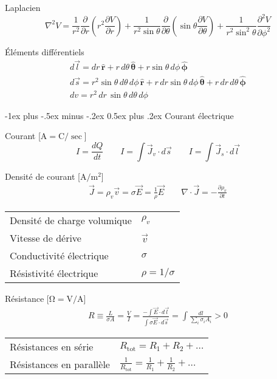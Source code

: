 \documentclass[10pt,landscape]{article}
\makeatletter
\renewcommand{\section}{\@startsection{section}{1}{0mm}%
                                {-1ex plus -.5ex minus -.2ex}%
                                {0.5ex plus .2ex}%
                                {\normalfont\large\bfseries}}
\newcommand{\extraline}{\vspace{1em}}
\newcommand{\tableindent}{\hspace{1.5em}}
\newcommand{\uvec}[1]{\ensuremath{\boldsymbol{\hat{#1}}}}
\makeatother
\begin{document}
\begin{multicols}{3}
Laplacien
\[ \nabla^2 V = \frac{1}{r^2} \frac{\partial}{\partial r}\left( r^2 \frac{\partial V}{\partial r} \right)
+ \frac{1}{r^2\sin\theta}\frac{\partial}{\partial \theta} \left( \sin\theta \frac{\partial V}{\partial\theta} \right)
+ \frac{1}{r^2\sin^2\theta}\frac{\partial^2 V}{\partial \phi^2} \]

Éléments différentiels
\begin{gather*}
d\vec{l} = dr\,\uvec{r} + r\,d\theta\,\uvec{\theta} + r\sin\theta\,d\phi\,\uvec{\phi} \\
d\vec{s} = r^2\sin\theta\,d\theta\,d\phi\,\uvec{r} 
+ r\,dr\sin\theta\,d\phi\,\uvec{\theta}
+ r\,dr\,d\theta\,\uvec{\phi} \\
dv = r^2\,dr\,\sin\theta\,d\theta\,d\phi
\end{gather*}


\hrulefill
\section{Courant électrique}

Courant [$\si{\ampere} = \si{\coulomb/\sec}$]
\[ I = \frac{dQ}{dt}
\qquad \textstyle
I =\int \vec{J}_v \cdot d\vec{s} \qquad
I = \int \vec{J}_s \cdot d\vec{l} \]

Densité de courant [$\si{\ampere/\metre^2}$]
\begin{gather*}
 \vec{J} = \rho_v \vec{v} = \sigma\vec{E} = \frac{1}{\rho} \vec{E} 
 \qquad
 \nabla\cdot\vec{J} = -\frac{\partial\rho_v}{\partial t}
\end{gather*}
%
\begin{tabular}{@{\tableindent}ll@{}}
	Densité de charge volumique & $\rho_v$ \\
	Vitesse de dérive & $\vec{v}$\\
	Conductivité électrique & $\sigma$  \\
	Résistivité électrique  & $\rho = 1/\sigma$ \\
\end{tabular}

\extraline
Résistance [$\si{\ohm} = \si{\volt/\ampere}$]
\begin{gather*}
R \equiv \frac{L}{\sigma A} = \frac{V}{I}
= \frac{-\int \vec{E}\cdot{d\vec{l}}}{\int \sigma\vec{E}\cdot{d\vec{s}}}
= \int\frac{dl}{\sum_i \sigma_i A_i} > 0
\end{gather*}
%
\begin{tabular}{@{\tableindent}ll@{}}
	Résistances en série & $R_\text{tot} = R_1 + R_2 + \dots$ \\
	Résistances en parallèle & $ \frac{1}{R_\text{tot}} = \frac{1}{R_1} + \frac{1}{R_2} + \dots$\\
\end{tabular}


\end{multicols}
\end{document}
